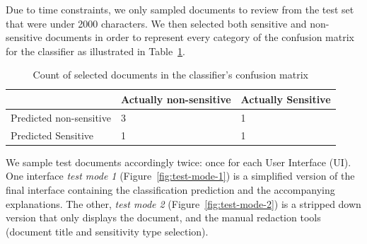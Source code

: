 \documentclass[\version]{l4proj}
\begin{document}
Due to time constraints, we only sampled documents to review from the test set that were under 2000 characters.
We then selected both sensitive and non-sensitive documents in order to represent every category of the confusion matrix for the classifier as illustrated in Table~\ref{tab:confusion-matrix-selection}.

\begin{table}[H]
    \centering
    \begin{tabular}{l|ll}
                                & Actually non-sensitive & Actually Sensitive \\ \hline
        Predicted non-sensitive & 3                      & 1                  \\
        Predicted Sensitive     & 1                      & 1
    \end{tabular}
    \caption{Count of selected documents in the classifier's confusion matrix}\label{tab:confusion-matrix-selection}
\end{table}

We sample test documents accordingly twice: once for each User Interface (UI).
One interface \textit{test mode 1} (Figure~\ref{fig:test-mode-1}) is a simplified version of the final interface containing the classification prediction and the accompanying explanations.
The other, \textit{test mode 2} (Figure~\ref{fig:test-mode-2}) is a stripped down version that only displays the document, and the manual redaction tools (document title and sensitivity type selection).
\end{document}
